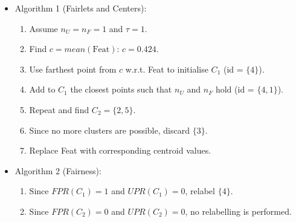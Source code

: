 \documentclass[runningheads]{llncs}
\begin{document}
\begin{itemize}
  \item Algorithm 1 (Fairlets and Centers):
    \begin{enumerate}
      \item Assume $n_U = n_F = 1$ and $\tau = 1$.
      \item Find $c = \textit{mean}(\text{Feat})$: $c = 0.424$.
      \item Use farthest point from $c$ w.r.t. Feat to initialise $C_1$ (id = $\{4\}$).
      \item Add to $C_1$ the closest points such that $n_U$ and $n_F$ hold (id = $\{4, 1 \}$).
      \item Repeat and find $C_2 = \{2, 5 \}$.
      \item Since no more clusters are possible, discard $\{3\}$.
      \item Replace Feat with corresponding centroid values.
    \end{enumerate}  \item Algorithm 2 (Fairness):
    \begin{enumerate}
      \item Since $\textit{FPR}(C_1) = 1$ and $\textit{UPR}(C_1) = 0$, relabel $\{4\}$.
      \item Since $\textit{FPR}(C_2) = 0$ and $\textit{UPR}(C_2) = 0$, no relabelling is performed.
    \end{enumerate}
\end{itemize}
\end{document}
